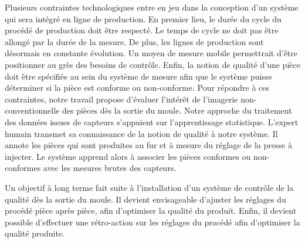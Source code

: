 Plusieurs contraintes technologiques entre en jeu dans la conception d'un système qui sera intégré en ligne de production.
En premier lieu, le durée du cycle du procédé de production doit être respecté.
Le temps de cycle ne doit pas être allongé par la durée de la mesure.
De plus, les lignes de production sont désormais en constante évolution.
Un moyen de mesure mobile permettrait d'être positionner au grès des besoins de contrôle.
Enfin, la notion de qualité d'une pièce doit être spécifiée au sein du système de mesure afin que le système puisse déterminer si la pièce est conforme ou non-conforme.
Pour répondre à ces contraintes, notre travail propose d'évaluer l'intérêt de l'imagerie non-conventionnelle des pièces dès la sortie du moule.
Notre approche du traitement des données issues de capteurs s'appuient sur l'apprentissage statistique.
L'expert humain transmet sa connaissance de la notion de qualité à notre système.
Il annote les pièces qui sont produites au fur et à mesure du réglage de la presse à injecter.
Le système apprend alors à associer les pièces conformes ou non-conformes avec les mesures brutes des capteurs.

Un objectif à long terme fait suite à l'installation d'un système de contrôle de la qualité dès la sortie du moule.
Il devient envisageable d'ajuster les réglages du procédé pièce après pièce, afin d'optimiser la qualité du produit.
Enfin, il devient possible d'effectuer une rétro-action sur les réglages du procédé afin d'optimiser la qualité produite.

